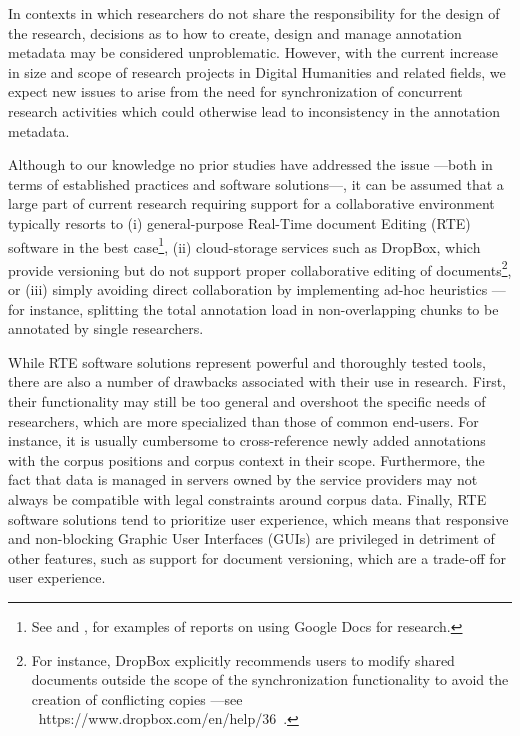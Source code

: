 \documentclass{sig-alternate}
\begin{document}
In contexts in which researchers do not share the responsibility for the design of the research,
decisions as to how to create, design and manage annotation metadata may be considered unproblematic.
However, with the current increase in size and scope of research projects in Digital Humanities and
related fields, we expect new issues to arise from the need for synchronization of concurrent
research activities which could otherwise lead to inconsistency in the annotation metadata.

Although to our knowledge no prior studies have addressed the issue ---both in terms of
established practices and software solutions---,
it can be assumed that a large part of current research requiring support for a
collaborative environment typically resorts to (i) general-purpose Real-Time document Editing
(RTE) software in the best case\footnote{
  See \cite{Rowlands2011} and \cite{Wood2011}, for examples of reports on using Google Docs
  for research.
}, (ii) cloud-storage services such as DropBox, which provide versioning but do
not support proper collaborative editing of documents\footnote{
  For instance, DropBox explicitly recommends users to modify shared documents outside the scope
  of the synchronization functionality to avoid the creation of conflicting copies ---see
  ~https://www.dropbox.com/en/help/36~.
}, or (iii) simply avoiding direct collaboration by implementing ad-hoc heuristics ---for
instance, splitting the total annotation load in non-overlapping chunks to be annotated by
single researchers.

While RTE software solutions represent powerful and thoroughly tested tools, there are also
a number of drawbacks associated with their use in research.
First, their functionality may still be too general and overshoot the specific needs of
researchers, which are more specialized than those of common end-users. For instance, it is usually
cumbersome to cross-reference newly added annotations with the corpus positions and corpus
context in their scope.
Furthermore, the fact that data is managed in servers owned by the service providers may not
always be compatible with legal constraints around corpus data.
Finally, RTE software solutions tend to prioritize user experience, which means that
responsive and non-blocking Graphic User Interfaces (GUIs) are privileged in detriment of
other features, such as support for document versioning, which are a trade-off for
user experience.
\end{document}
